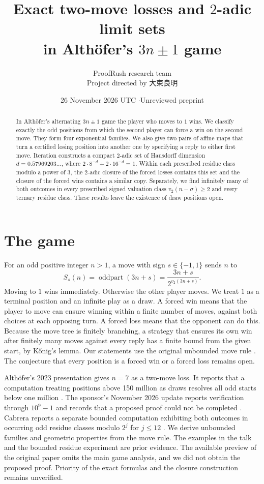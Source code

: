 \documentclass[11pt]{article}
\title{Exact two-move losses and \(2\)-adic limit sets\\in Althöfer's \(3n\pm1\) game}
\author{ProofRush research team\\[-1pt]\small Project directed by {\namefont 大束良明}}
\date{26 November 2026 UTC \quad\(\cdot\)\quad Unreviewed preprint}
\newcommand{\oddpart}{\operatorname{oddpart}}
\newcommand{\vTwo}{v_2}
\begin{document}
\maketitle
\begin{abstract}
In Althöfer's alternating \(3n\pm1\) game the player who moves to \(1\) wins. We classify exactly the odd positions from which the second player can force a win on the second move. They form four exponential families. We also give two pairs of affine maps that turn a certified losing position into another one by specifying a reply to either first move. Iteration constructs a compact \(2\)-adic set of Hausdorff dimension \(d=0.57969203\ldots\), where \(2\cdot 8^{-d}+2\cdot 16^{-d}=1\). Within each prescribed residue class modulo a power of \(3\), the \(2\)-adic closure of the forced losses contains this set and the closure of the forced wins contains a similar copy. Separately, we find infinitely many of both outcomes in every prescribed signed valuation class \(\vTwo(n-\sigma)\ge2\) and every ternary residue class. These results leave the existence of draw positions open.
\end{abstract}

\section{The game}

For an odd positive integer \(n>1\), a move with sign \(s\in\{-1,1\}\) sends \(n\) to
\[
 S_s(n)=\oddpart(3n+s)=\frac{3n+s}{2^{\vTwo(3n+s)}} .
\]
Moving to \(1\) wins immediately. Otherwise the other player moves. We treat \(1\) as a terminal position and an infinite play as a draw. A forced win means that the player to move can ensure winning within a finite number of moves, against both choices at each opposing turn. A forced loss means that the opponent can do this. Because the move tree is finitely branching, a strategy that ensures its own win after finitely many moves against every reply has a finite bound from the given start, by Kőnig's lemma. Our statements use the original unbounded move rule \cite{sponsor,ahz}. The conjecture that every position is a forced win or a forced loss remains open.

Althöfer's 2023 presentation gives \(n=7\) as a two-move loss. It reports that a computation treating positions above 150 million as draws resolves all odd starts below one million \cite{talk}. The sponsor's November 2026 update reports verification through \(10^9-1\) and records that a proposed proof could not be completed \cite{sponsor}. Cabrera reports a separate bounded computation exhibiting both outcomes in occurring odd residue classes modulo \(2^j\) for \(j\le12\) \cite{cabrera}. We derive unbounded families and geometric properties from the move rule. The examples in the talk and the bounded residue experiment are prior evidence. The available preview of the original paper omits the main game analysis, and we did not obtain the proposed proof. Priority of the exact formulas and the closure construction remains unverified.
\end{document}
